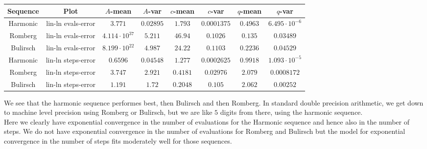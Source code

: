 \begin{table}[H]
    \centering
        \small
    \begin{tabular}{c|c||c|c|c|c|c	|c}
Sequence & Plot & \(A\)-mean & \(A\)-var & \(c\)-mean & \(c\)-var & \(q\)-mean & \(q\)-var\\\hline
\rowcolor{green}
Harmonic & lin-ln evals-error & \(3.771\) & \(0.02895\) & \(1.793\) & \(0.0001375\) & \(0.4963\) & \(6.495\cdot 10^{-6}\) \\
\rowcolor{yellow}
Romberg & lin-ln evals-error & \(4.114\cdot 10^{37}\) & \(5.211\) & \(46.94\) & \(0.1026\) & \(0.135\) & \(0.03489\) \\
\rowcolor{yellow}
Bulirsch & lin-ln evals-error & \(8.199\cdot 10^{22}\) & \(4.987\) & \(24.22\) & \(0.1103\) & \(0.2236\) & \(0.04529\) \\
\rowcolor{green}
Harmonic & lin-ln steps-error & \(0.6596\) & \(0.04548\) & \(1.277\) & \(0.0002625\) & \(0.9918\) & \(1.093\cdot 10^{-5}\) \\
\rowcolor{red}
Romberg & lin-ln steps-error & \(3.747\) & \(2.921\) & \(0.4181\) & \(0.02976\) & \(2.079\) & \(0.0008172\) \\
\rowcolor{red}
Bulirsch & lin-ln steps-error & \(1.191\) & \(1.72\) & \(0.2048\) & \(0.105\) & \(2.062\) & \(0.00252\) \\
    \end{tabular}
    \label{tab:my_label}
\end{table}

We see that the harmonic sequence performes best, then Bulirsch and then Romberg. In standard double precision arithmetic, we get down to machine level precision using Romberg or Bulirsch, but we are like \(5\) digits from there, using the harmonic sequence.\\

Here we clearly have exponential convergence in the number of evaluations for the Harmonic sequence and hence also in the number of steps. We do not have exponential convergence in the number of evaluations for Romberg and Bulirsch but the model for exponential convergence in the number of steps fits moderately well for those sequences. 

